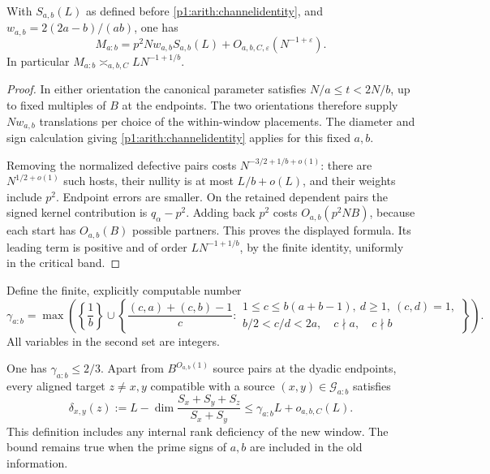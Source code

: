 \begin{lemma}
\label{p1:arith:fixed-channel-mass}
With \(S_{a,b}(L)\) as defined before
\eqref{p1:arith:channelidentity}, and
\(w_{a,b}=2(2a-b)/(ab)\), one has
\[
 M_{a:b}=p^2Nw_{a,b}S_{a,b}(L)
          +O_{a,b,C,\varepsilon}(N^{-1+\varepsilon}).
\]
In particular \(M_{a:b}\asymp_{a,b,C}L N^{-1+1/b}\).
\end{lemma}

\begin{proof}
In either orientation the canonical parameter satisfies
\(N/a\leq t<2N/b\), up to fixed multiples of \(B\) at the endpoints.
The two orientations therefore supply \(Nw_{a,b}\) translations per
choice of the within-window placements.
The diameter and sign calculation giving
\eqref{p1:arith:channelidentity} applies for this fixed \(a,b\).

Removing the normalized defective pairs costs
\(N^{-3/2+1/b+o(1)}\): there are \(N^{1/2+o(1)}\) such hosts,
their nullity is at most \(L/b+o(L)\), and their weights include \(p^2\).
Endpoint errors are smaller.
On the retained dependent pairs the signed kernel contribution is
\(q_\alpha-p^2\).  Adding back \(p^2\) costs \(O_{a,b}(p^2NB)\),
because each start has \(O_{a,b}(B)\) possible partners.
This proves the displayed formula.
Its leading term is positive and of order \(L N^{-1+1/b}\), by the
finite identity, uniformly in the critical band.
\end{proof}

Define the finite, explicitly computable number
\begin{equation}\label{p1:arith:gamma-fixed-channel}
 \gamma_{a:b}=
 \max\left(
 \left\{\frac1b\right\}\cup
 \left\{\frac{(c,a)+(c,b)-1}{c}:
 \begin{array}{l}
 1\leq c\leq b(a+b-1),\ d\geq1,\ (c,d)=1,\\
 b/2<c/d<2a,\quad c\nmid a,\quad c\nmid b
 \end{array}\right\}\right).
\end{equation}
All variables in the second set are integers.

\begin{lemma}
\label{p1:arith:fixed-channel-rank}
One has \(\gamma_{a:b}\leq2/3\).
Apart from \(B^{O_{a,b}(1)}\) source pairs at the dyadic endpoints,
every aligned target \(z\ne x,y\) compatible with a source
\((x,y)\in\mathcal G_{a:b}\) satisfies
\[
 \delta_{x,y}(z):=
 L-\dim\frac{S_x+S_y+S_z}{S_x+S_y}
 \leq\gamma_{a:b}L+o_{a,b,C}(L).
\]
This definition includes any internal rank deficiency of the new window.
The bound remains true when the prime signs of \(a,b\) are included in
the old information.
\end{lemma}

